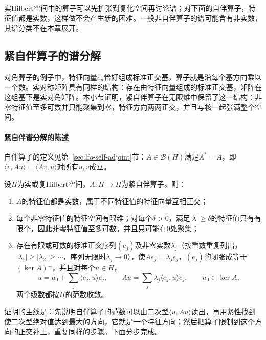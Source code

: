 实Hilbert空间中的算子可以先扩张到复化空间再讨论谱；对下面的自伴算子，特征值都是实数，这样做不会产生新的困难。一般非自伴算子的谱可能含有非实数，其谱分类不在本章展开。

\subsection{紧自伴算子的谱分解}
\label{sec:ose-spectral-theorem}

对角算子的例子中，特征向量$e_n$恰好组成标准正交基，算子就是沿每个基方向乘以一个数。实对称矩阵具有同样的结构：存在由特征向量组成的标准正交基，矩阵在这组基下是实对角矩阵。本小节证明，紧自伴算子在无限维中保留了这一结构：非零特征值至多可数并只能聚集到零，特征方向两两正交，并且与核一起张满整个空间。

\paragraph{紧自伴谱分解的陈述}
自伴算子的定义见第~\ref{sec:lfo-self-adjoint}节：$A\in\mathcal B(H)$满足$A^*=A$，即$\langle v,Au\rangle=\langle Av,u\rangle$对所有$u,v$成立。

\begin{theorem}[紧自伴算子的谱分解]
\label{thm:ose-compact-selfadjoint}
设$H$为实或复Hilbert空间，$A:H\to H$为紧自伴算子。则：
\begin{enumerate}
  \item $A$的特征值都是实数，属于不同特征值的特征向量互相正交；
  \item 每个非零特征值的特征空间有限维；对每个$\delta>0$，满足$|\lambda|\geq\delta$的特征值只有有限个，因此非零特征值至多可数，并且只可能在$0$处聚集；
  \item 存在有限或可数的标准正交序列$(e_j)$及非零实数$\lambda_j$（按重数重复列出，$|\lambda_1|\geq|\lambda_2|\geq\cdots$，序列无限时$\lambda_j\to0$），使$Ae_j=\lambda_je_j$，$(e_j)$的闭张成等于$(\ker A)^\perp$，并且对每个$u\in H$，
  \begin{equation}
    u=u_0+\sum_j\langle e_j,u\rangle e_j,\qquad Au=\sum_j\lambda_j\langle e_j,u\rangle e_j,\qquad u_0\in\ker A,
    \label{eq:ose-spectral-expansion}
  \end{equation}
  两个级数都按$H$的范数收敛。
\end{enumerate}
\end{theorem}

证明的主线是：先说明自伴算子的范数可以由二次型$\langle u,Au\rangle$读出，再用紧性找到使二次型绝对值达到最大的方向，它就是一个特征方向；然后把算子限制到这个方向的正交补上，重复同样的步骤。下面分步完成。

